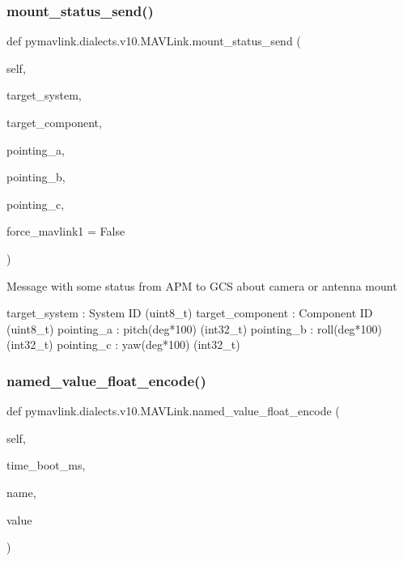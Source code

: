 \begin{DoxyVerb}
\begin{DoxyVerb}
\begin{DoxyVerb}
\begin{DoxyVerb}
\subsubsection{\texorpdfstring{mount\+\_\+status\+\_\+send()}{mount\_status\_send()}}
{\footnotesize\ttfamily def pymavlink.\+dialects.\+v10.\+M\+A\+V\+Link.\+mount\+\_\+status\+\_\+send (\begin{DoxyParamCaption}\item[{}]{self,  }\item[{}]{target\+\_\+system,  }\item[{}]{target\+\_\+component,  }\item[{}]{pointing\+\_\+a,  }\item[{}]{pointing\+\_\+b,  }\item[{}]{pointing\+\_\+c,  }\item[{}]{force\+\_\+mavlink1 = {\ttfamily False} }\end{DoxyParamCaption})}

\begin{DoxyVerb}Message with some status from APM to GCS about camera or antenna mount

target_system             : System ID (uint8_t)
target_component          : Component ID (uint8_t)
pointing_a                : pitch(deg*100) (int32_t)
pointing_b                : roll(deg*100) (int32_t)
pointing_c                : yaw(deg*100) (int32_t)\end{DoxyVerb}
 \mbox{\label{classpymavlink_1_1dialects_1_1v10_1_1MAVLink_a7cd1482ce96acb0b44f62ce7562df767}} 
\subsubsection{\texorpdfstring{named\+\_\+value\+\_\+float\+\_\+encode()}{named\_value\_float\_encode()}}
{\footnotesize\ttfamily def pymavlink.\+dialects.\+v10.\+M\+A\+V\+Link.\+named\+\_\+value\+\_\+float\+\_\+encode (\begin{DoxyParamCaption}\item[{}]{self,  }\item[{}]{time\+\_\+boot\+\_\+ms,  }\item[{}]{name,  }\item[{}]{value }\end{DoxyParamCaption})}


\end{DoxyVerb}
\end{DoxyVerb}
\end{DoxyVerb}
\end{DoxyVerb}
